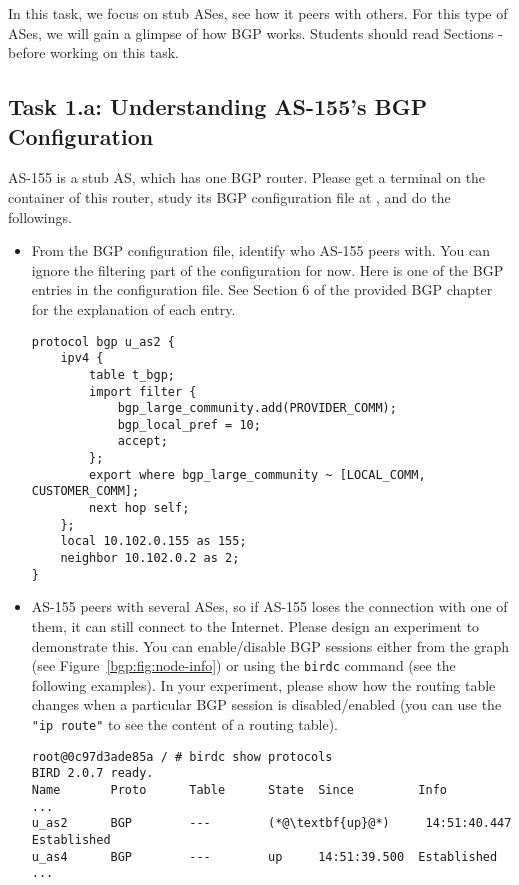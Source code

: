 In this task, we focus on stub ASes, see how it peers with others. 
For this type of ASes, we will gain a glimpse of how BGP works. 
Students should read Sections \bgpintro - \bgpupdate 
before working on this task. 

\subsection{Task 1.a: Understanding AS-155's BGP Configuration} 

AS-155 is a stub AS, which has one BGP router. Please  
get a terminal on the container of this router, study its 
BGP configuration file at , and
do the followings.

\begin{itemize}
  \item From the BGP configuration file, identify who
    AS-155 peers with. You can ignore the filtering
    part of the configuration for now. Here is one of the
    BGP entries in the configuration file. See Section 6
    of the provided BGP chapter for the explanation of each entry.
    
\begin{lstlisting}
protocol bgp u_as2 {
    ipv4 {
        table t_bgp;
        import filter {
            bgp_large_community.add(PROVIDER_COMM);
            bgp_local_pref = 10;
            accept;
        };
        export where bgp_large_community ~ [LOCAL_COMM, CUSTOMER_COMM];
        next hop self;
    };
    local 10.102.0.155 as 155;
    neighbor 10.102.0.2 as 2;
}
\end{lstlisting}
     

  \item AS-155 peers with several ASes, so if AS-155
    loses the connection with one of them, it can still connect
    to the Internet. Please design an experiment to 
    demonstrate this. You can enable/disable BGP sessions
    either from the graph (see Figure~\ref{bgp:fig:node-info}) or
    using the \texttt{birdc} command (see the following examples). 
    In your experiment, please show how the routing table changes when a particular 
    BGP session is disabled/enabled (you can use the \texttt{"ip route"} to 
    see the content of a routing table). 


\begin{lstlisting}
root@0c97d3ade85a / # birdc show protocols
BIRD 2.0.7 ready.
Name       Proto      Table      State  Since         Info
...
u_as2      BGP        ---        (*@\textbf{up}@*)     14:51:40.447  Established
u_as4      BGP        ---        up     14:51:39.500  Established
...


\end{lstlisting}
\end{itemize}

